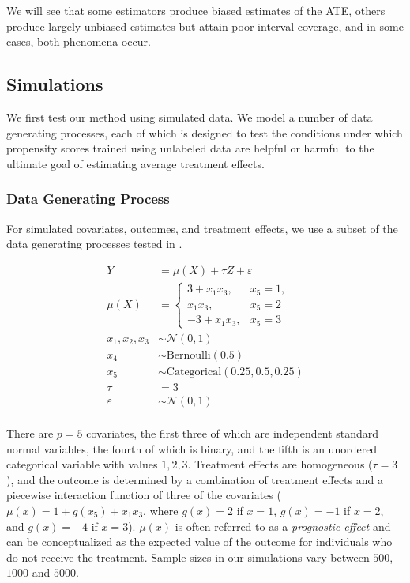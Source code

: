 \documentclass[aos]{imsart}
\begin{document}
We will see that some estimators produce biased estimates of the ATE, others produce largely unbiased estimates
but attain poor interval coverage, and in some cases, both phenomena occur. 

\subsection{Simulations}

We first test our method using simulated data. We model a number of data generating processes, each of which is designed to 
test the conditions under which propensity scores trained using unlabeled data are helpful or harmful to the ultimate
goal of estimating average treatment effects.

\subsubsection{Data Generating Process}

For simulated covariates, outcomes, and treatment effects, we use a subset of the data generating processes tested in \cite{hahn2017bayesian}. 

\begin{align*}
Y &= \mu(X) + \tau Z + \varepsilon\\
\mu(X) &= 
\begin{cases}
3 + x_1 x_3,&  x_5 = 1,\\
x_1 x_3,&  x_5 = 2\\
-3 + x_1 x_3,&  x_5 = 3
\end{cases} \\
x_1, x_2, x_3 &\sim \mathcal{N}(0, 1)\\
x_4 &\sim \textrm{Bernoulli}(0.5)\\
x_5 &\sim \textrm{Categorical}(0.25, 0.5, 0.25)\\
\tau &= 3\\
\varepsilon &\sim \mathcal{N}(0, 1)\\
\end{align*}

There are $p = 5$ covariates, the first three of which are independent standard normal variables, the fourth of which is binary, 
and the fifth is an unordered categorical variable with values $1, 2, 3$. Treatment effects are homogeneous ($\tau = 3$), and 
the outcome is determined by a combination of treatment effects and a piecewise interaction function of three of the covariates
($\mu(x) = 1 + g(x_5) + x_1 x_3$, where $g(x) = 2$ if $x = 1$, $g(x) = -1$ if $x = 2$, and $g(x) = -4$ if $x = 3$). 
$\mu(x)$ is often referred to as a \textit{prognostic effect} and can be conceptualized as the expected value of 
the outcome for individuals who do not receive the treatment.
Sample sizes in our simulations vary between $500$, $1000$ and $5000$. 
\end{document}

